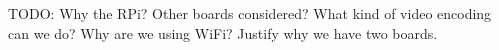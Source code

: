 TODO: Why the RPi? Other boards considered? What kind of video encoding can we do? Why are we using WiFi? Justify why we have two boards.